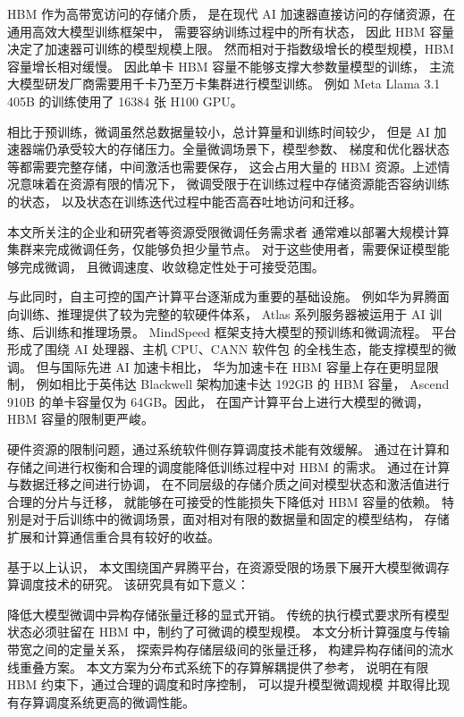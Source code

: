 \documentclass[bachelor,openany,oneside,color,AutoFakeBold=true]{buaathesis}
\begin{document}
HBM 作为高带宽访问的存储介质，
是在现代 AI 加速器直接访问的存储资源，在通用高效大模型训练框架中，
需要容纳训练过程中的所有状态，
因此 HBM 容量决定了加速器可训练的模型规模上限。
然而相对于指数级增长的模型规模，HBM 容量增长相对缓慢。
因此单卡 HBM 容量不能够支撑大参数量模型的训练，
主流大模型研发厂商需要用千卡乃至万卡集群进行模型训练。
例如 Meta Llama 3.1 405B 的训练使用了 16384 张 H100 GPU。

相比于预训练，微调虽然总数据量较小，总计算量和训练时间较少，
但是 AI 加速器端仍承受较大的存储压力。全量微调场景下，模型参数、
梯度和优化器状态等都需要完整存储，中间激活也需要保存，
这会占用大量的 HBM 资源。上述情况意味着在资源有限的情况下，
微调受限于在训练过程中存储资源能否容纳训练的状态，
以及状态在训练迭代过程中能否高吞吐地访问和迁移。

本文所关注的企业和研究者等资源受限微调任务需求者
通常难以部署大规模计算集群来完成微调任务，仅能够负担少量节点。
对于这些使用者，需要保证模型能够完成微调，
且微调速度、收敛稳定性处于可接受范围。

与此同时，自主可控的国产计算平台逐渐成为重要的基础设施。
例如华为昇腾面向训练、推理提供了较为完整的软硬件体系，
Atlas 系列服务器被运用于 AI 训练、后训练和推理场景。
MindSpeed 框架支持大模型的预训练和微调流程。
平台形成了围绕 AI 处理器、主机 CPU、CANN 软件包
的全栈生态，能支撑模型的微调。
但与国际先进 AI 加速卡相比，
华为加速卡在 HBM 容量上存在更明显限制，
例如相比于英伟达 Blackwell 架构加速卡达 192GB 的 HBM 容量，
Ascend 910B 的单卡容量仅为 64GB。因此，
在国产计算平台上进行大模型的微调，
HBM 容量的限制更严峻。

硬件资源的限制问题，通过系统软件侧存算调度技术能有效缓解。
通过在计算和存储之间进行权衡和合理的调度能降低训练过程中对 HBM 的需求。
通过在计算与数据迁移之间进行协调，
在不同层级的存储介质之间对模型状态和激活值进行合理的分片与迁移，
就能够在可接受的性能损失下降低对 HBM 容量的依赖。
特别是对于后训练中的微调场景，面对相对有限的数据量和固定的模型结构，
存储扩展和计算通信重合具有较好的收益。

基于以上认识，
本文围绕国产昇腾平台，在资源受限的场景下展开大模型微调存算调度技术的研究。
该研究具有如下意义：

降低大模型微调中异构存储张量迁移的显式开销。
传统的执行模式要求所有模型状态必须驻留在 HBM 中，制约了可微调的模型规模。
本文分析计算强度与传输带宽之间的定量关系，
探索异构存储层级间的张量迁移，
构建异构存储间的流水线重叠方案。
本文方案为分布式系统下的存算解耦提供了参考，
说明在有限 HBM 约束下，通过合理的调度和时序控制，
可以提升模型微调规模
并取得比现有存算调度系统更高的微调性能。
\end{document}
